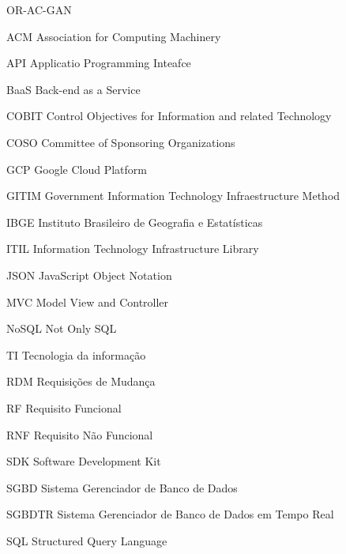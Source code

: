 \documentclass[diss]{template/setrem}
\begin{document}
\begin{listofabbrv}{OR-AC-GAN} %
    \item[ACM] {Association for Computing Machinery}
    \item[API] {Applicatio Programming Inteafce}
    \item[BaaS] {Back-end as a Service}
    \item[COBIT]{Control Objectives for Information and related Technology}
    \item[COSO] {Committee of Sponsoring Organizations}
    \item[GCP] {Google Cloud Platform}
    \item[GITIM]{Government Information Technology Infraestructure Method}
    \item[IBGE] {Instituto Brasileiro de Geografia e Estatísticas}
    \item[ITIL] {Information Technology Infrastructure Library}
    \item[JSON] {JavaScript Object Notation}
    \item[MVC] {Model View and Controller}
    \item[NoSQL]{Not Only SQL}
    \item[TI]{Tecnologia da informação}
    \item[RDM]{Requisições de Mudança}
    \item[RF]{Requisito Funcional}
    \item[RNF]{Requisito Não Funcional}
    \item[SDK]{Software Development Kit}
    \item[SGBD]{Sistema Gerenciador de Banco de Dados}
    \item[SGBDTR]{Sistema Gerenciador de Banco de Dados em Tempo Real}
    \item[SQL]{Structured Query Language} 
\end{listofabbrv}
\tableofcontents








\clearpage


\end{document}
